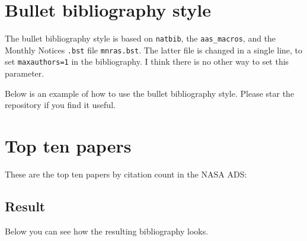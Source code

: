 \documentclass{article}
\begin{document}
\section*{Bullet bibliography style}

The bullet bibliography style is based on {\tt natbib}, the {\tt aas\_macros}, and the Monthly Notices {\tt .bst} file {\tt mnras.bst}. The latter file is  changed in a single line, to set {\tt maxauthors=1} in the bibliography. I think there is no other way to set this parameter. 

Below is an example of how to use the bullet bibliography style. Please star the repository if you find it useful.

\section*{Top ten papers}

These are the top ten papers by citation count in the NASA ADS: \citet{1973A&A....24..337S,1998ApJ...500..525S,1998AJ....116.1009R,2016A&A...594A..13P,2020A&A...641A...6P,1999ApJ...517..565P,1981PhRvB..23.5048P,2005Natur.438..197N,2013A&A...558A..33A,2016PhRvL.116f1102A}

\subsection*{Result}
Below you can see how the resulting bibliography looks.



\end{document}
